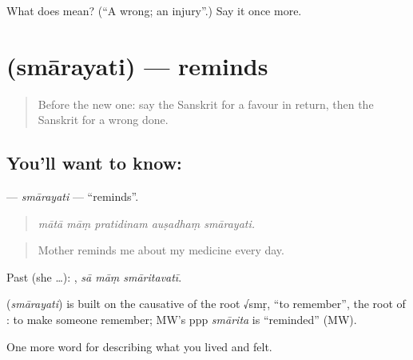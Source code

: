 \begin{tcolorbox}[breakable,colback=teal!4,colframe=teal!35!black,title={Before you move on}]
What does  mean? (\textquotedblleft{}A wrong; an injury\textquotedblright{}.) Say it once more.
\end{tcolorbox}
\section[\texorpdfstring{\sk{स्मारयति} (smārayati)}{स्मारयति (smārayati)}]{ (smārayati) — reminds}

\label{lesson:SA-C468-smarayati}



\begin{quote}
Before the new one: say the Sanskrit for a favour in return, then the Sanskrit for a wrong done.
\end{quote}

\subsection*{You'll want to know: }
\textbf{} — \emph{smārayati} — \textquotedblleft{}reminds\textquotedblright{}.

\begin{quote}
    
\end{quote}

\begin{quote}
\emph{mātā māṃ pratidinam auṣadhaṃ smārayati.}
\end{quote}

\begin{quote}
Mother reminds me about my medicine every day.
\end{quote}

Past (she …):   , \emph{sā māṃ smāritavatī}.

\begin{cousinweb}
\textbf{} (\emph{smārayati}) is built on the causative of the root √smṛ, \textquotedblleft{}to remember\textquotedblright{}, the root of \textbf{}: to make someone remember; MW's ppp \emph{smārita} is \textquotedblleft{}reminded\textquotedblright{} (MW).
\end{cousinweb}

\begin{grammarlens}[title={What you've built}]
One more word for describing what you lived and felt.
\end{grammarlens}

